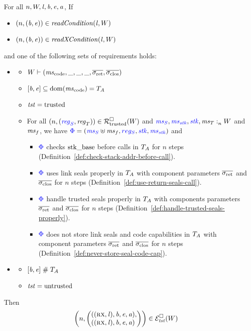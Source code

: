 \documentclass[a4paper]{article}
\begin{document}
\begin{theorem}[FTLR]
  \label{thm:ftlr}
  For all $n,W,\mathit{l},\mathit{b},\mathit{e},\mathit{a}$,
  If
  \begin{itemize}
  \item $\npair{(\baddr,\eaddr)} \in \readCond{\lin,W}$
  \item $\npair{(\baddr,\eaddr)} \in \xReadCond{\lin,W}$
  \end{itemize}
  and one of the following sets of requirements holds:
  \begin{itemize}
  \item \begin{itemize}
    \item $W \vdash (\mscode,\_,\_,\_,\sigrets,\sigcloss)$
    \item $[\baddr,\eaddr] \subseteq \dom(\mscode) = \ta$
    \item $\mathit{tst} = \mathrm{trusted}$
    \item For all $\npair{\stpair{\reg}{\reg}} \in \lrrtrusted(W)$ and ${\color{blue} \mathit{ms}_S},{\color{blue} \mathit{ms}_{\mathit{stk}}},{\color{blue} \mathit{stk}},\mathit{ms}_T :_{n}^{}W$ and $\mathit{ms}_f$, we have ${\color{blue} \Phi} = ({\color{blue} \mathit{ms}_S} \uplus \mathit{ms}_f, {\color{blue} reg_S}, {\color{blue} \mathit{stk}}, {\color{blue} \mathit{ms}_{\mathit{stk}}})$ and 
      \begin{itemize}           
      \item ${\color{blue} \Phi}$ checks $\mathrm{stk\_base}$ before calls in $T_A$ for $n$ steps (Definition~\ref{def:check-stack-addr-before-call}).
      \item ${\color{blue} \Phi}$ uses link seals properly in $T_A$ with component parameters $\sigrets$ and $\sigcloss$ for $n$ steps (Definition~\ref{def:use-return-seals-call}).
      \item ${\color{blue} \Phi}$ handle trusted seals properly in $T_A$ with components parameters $\sigrets$ and $\sigcloss$ for $n$ steps (Definition~\ref{def:handle-trusted-seals-properly}).
      \item ${\color{blue} \Phi}$ does not store link seals and code capabilities in $T_A$ with component parameters $\sigrets$ and $\sigcloss$ for $n$ steps (Definition~\ref{def:never-store-seal-code-cap}).
      \end{itemize}
    \end{itemize}
  \item
    \begin{itemize}
    \item $[\mathit{b},\mathit{e}] \mathrel{\#} T_A$
    \item $\mathit{tst} = \mathrm{untrusted}$
    \end{itemize}
  \end{itemize}
  Then
  \[
    \npair{\left(\arraycolsep=0pt\array{l}((\rx,\lin),\baddr,\eaddr,\aaddr),\\
      ((\rx,\lin),\baddr,\eaddr,\aaddr)\endarray\right)} \in \lreg{\trust}(W)
  \]
\end{theorem}
\end{document}
